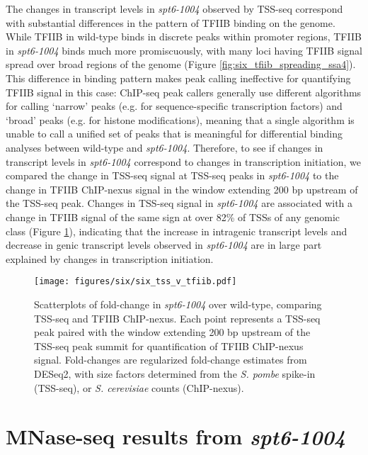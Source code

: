 The changes in transcript levels in \textit{spt6-1004} observed by TSS-seq correspond with substantial differences in the pattern of TFIIB binding on the genome.
While TFIIB in wild-type binds in discrete peaks within promoter regions, TFIIB in \textit{spt6-1004} binds much more promiscuously, with many loci having TFIIB signal spread over broad regions of the genome (Figure \ref{fig:six_tfiib_spreading_ssa4}).
This difference in binding pattern makes peak calling ineffective for quantifying TFIIB signal in this case: ChIP-seq peak callers generally use different algorithms for calling `narrow' peaks (e.g. for sequence-specific transcription factors) and `broad' peaks (e.g. for histone modifications), meaning that a single algorithm is unable to call a unified set of peaks that is meaningful for differential binding analyses between wild-type and \textit{spt6-1004}.
Therefore, to see if changes in transcript levels in \textit{spt6-1004} correspond to changes in transcription initiation, we compared the change in TSS-seq signal at TSS-seq peaks in \textit{spt6-1004} to the change in TFIIB ChIP-nexus signal in the window extending 200 bp upstream of the TSS-seq peak.
Changes in TSS-seq signal in \textit{spt6-1004} are associated with a change in TFIIB signal of the same sign at over 82\% of TSSs of any genomic class (Figure \ref{fig:six_tss_v_tfiib}), indicating that the increase in intragenic transcript levels and decrease in genic transcript levels observed in \textit{spt6-1004} are in large part explained by changes in transcription initiation.
\begin{figure}[h]
    \centering
    \texttt{[image: figures/six/six\_tss\_v\_tfiib.pdf]}
    \caption[Scatterplots of fold-change in \textit{spt6-1004} over wild-type, comparing TSS-seq and TFIIB ChIP-nexus.]{Scatterplots of fold-change in \textit{spt6-1004} over wild-type, comparing TSS-seq and TFIIB ChIP-nexus. Each point represents a TSS-seq peak paired with the window extending 200 bp upstream of the TSS-seq peak summit for quantification of TFIIB ChIP-nexus signal. Fold-changes are regularized fold-change estimates from DESeq2, with size factors determined from the \textit{S. pombe} spike-in (TSS-seq), or \textit{S. cerevisiae} counts (ChIP-nexus).}
    \label{fig:six_tss_v_tfiib}
\end{figure}


\section{MNase-seq results from \textit{spt6-1004}}

